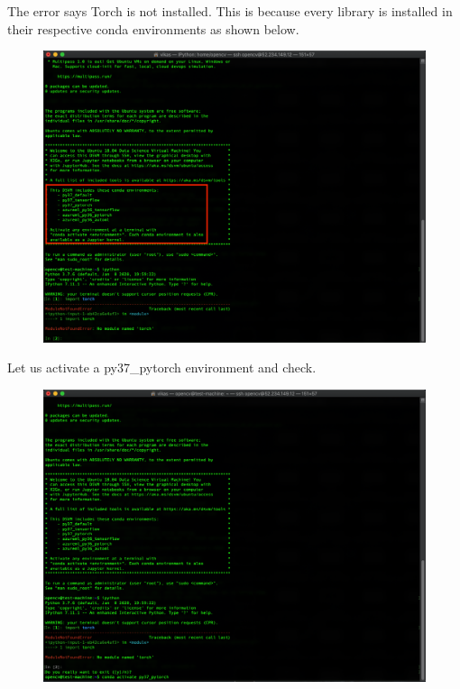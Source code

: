 The error says Torch is not installed. This is because every library is installed in their respective conda environments as shown below.

\begin{figure}[H]
\begin{center} 
\includegraphics[scale=0.40]{figures/ssh9}
\end{center}
\end{figure}

Let us activate a py37\_pytorch environment and check.

\begin{figure}[H]
\begin{center} 
\includegraphics[scale=0.40]{figures/ssh10}
\end{center}
\end{figure}

